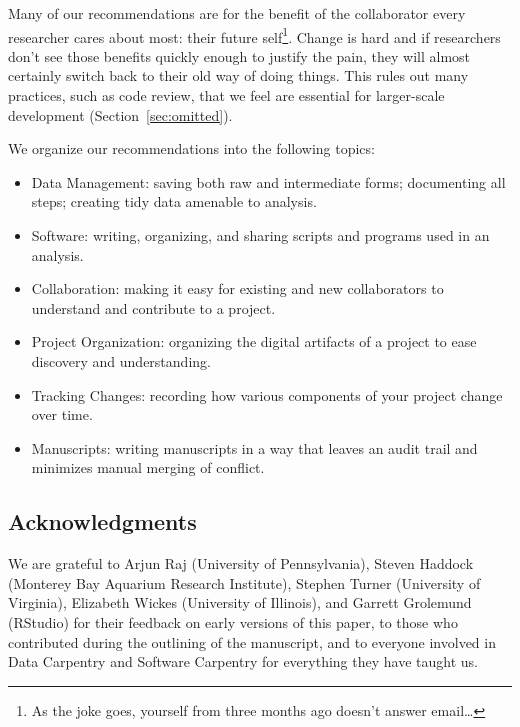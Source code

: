 \documentclass[10pt,letterpaper]{article}
\begin{document}
Many of our recommendations are for the benefit of the collaborator
every researcher cares about most: their future self\footnote{As the
joke goes, yourself from three months ago doesn't answer
email{\ldots}}. Change is hard and if researchers don't see those
benefits quickly enough to justify the pain, they will almost
certainly switch back to their old way of doing things.  This rules
out many practices, such as code review, that we feel are essential
for larger-scale development (Section~\ref{sec:omitted}).

We organize our recommendations into the following topics:

\begin{itemize}

\item Data Management:
  saving both raw and intermediate forms; documenting all steps;
  creating tidy data amenable to analysis.

\item Software:
  writing, organizing, and sharing scripts and programs used in an
  analysis.

\item Collaboration:
  making it easy for existing and new collaborators to understand and
  contribute to a project.

\item Project Organization:
  organizing the digital artifacts of a project to ease discovery and
  understanding.

\item Tracking Changes:
  recording how various components of your project change over time.

\item Manuscripts:
  writing manuscripts in a way that leaves an audit trail and
  minimizes manual merging of conflict.

\end{itemize}

\subsection*{Acknowledgments}

We are grateful to Arjun Raj (University of Pennsylvania), Steven
Haddock (Monterey Bay Aquarium Research Institute), Stephen Turner
(University of Virginia), Elizabeth Wickes (University of Illinois),
and Garrett Grolemund (RStudio) for their feedback on early versions
of this paper, to those who contributed during the outlining of the
manuscript, and to everyone involved in Data Carpentry and Software
Carpentry for everything they have taught us.
\end{document}
